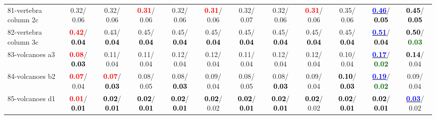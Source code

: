\begin{table}[h]
\begin{center}
{\begin{tabular}{lc|c|c|c|c|c|c|c|c|c|c}
81-vertebra column 2c &   0.32/  0.06 &   0.32/  0.06 & \textcolor{red}{\textbf{  0.31}}/  0.06 &   0.32/  0.06 & \textcolor{red}{\textbf{  0.31}}/  0.06 &   0.32/  0.07 &   0.32/  0.06 & \textcolor{red}{\textbf{  0.31}}/  0.06 &   0.35/  0.06 & \underline{\textcolor{blue}{\textbf{  0.46}}}/\textcolor{black}{\textbf{  0.05}} & \textcolor{black}{\textbf{  0.45}}/\textcolor{black}{\textbf{  0.05}} \\
82-vertebra column 3c & \textcolor{red}{\textbf{  0.42}}/\textcolor{black}{\textbf{  0.04}} &   0.43/\textcolor{black}{\textbf{  0.04}} &   0.45/\textcolor{black}{\textbf{  0.04}} &   0.45/\textcolor{black}{\textbf{  0.04}} &   0.45/\textcolor{black}{\textbf{  0.04}} &   0.45/\textcolor{black}{\textbf{  0.04}} &   0.45/\textcolor{black}{\textbf{  0.04}} &   0.45/\textcolor{black}{\textbf{  0.04}} &   0.45/\textcolor{black}{\textbf{  0.04}} & \underline{\textcolor{blue}{\textbf{  0.51}}}/\textcolor{black}{\textbf{  0.04}} & \textcolor{black}{\textbf{  0.50}}/\textcolor{darkgreen}{\textbf{  0.03}} \\
83-volcanoes a3 & \textcolor{red}{\textbf{  0.08}}/\textcolor{black}{\textbf{  0.03}} &   0.11/  0.04 &   0.11/  0.04 &   0.12/  0.04 &   0.12/  0.04 &   0.11/  0.04 &   0.12/  0.04 &   0.12/  0.04 &   0.10/  0.04 & \underline{\textcolor{blue}{\textbf{  0.17}}}/\textcolor{darkgreen}{\textbf{  0.02}} & \textcolor{black}{\textbf{  0.14}}/  0.04 \\
84-volcanoes b2 & \textcolor{red}{\textbf{  0.07}}/  0.04 & \textcolor{red}{\textbf{  0.07}}/\textcolor{black}{\textbf{  0.03}} &   0.08/  0.05 &   0.08/\textcolor{black}{\textbf{  0.03}} &   0.09/  0.04 &   0.08/  0.05 &   0.08/\textcolor{black}{\textbf{  0.03}} &   0.09/  0.04 & \textcolor{black}{\textbf{  0.10}}/\textcolor{black}{\textbf{  0.03}} & \underline{\textcolor{blue}{\textbf{  0.19}}}/\textcolor{darkgreen}{\textbf{  0.02}} &   0.09/  0.04 \\
85-volcanoes d1 & \textcolor{red}{\textbf{  0.01}}/\textcolor{black}{\textbf{  0.01}} & \textcolor{black}{\textbf{  0.02}}/\textcolor{black}{\textbf{  0.01}} & \textcolor{black}{\textbf{  0.02}}/\textcolor{black}{\textbf{  0.01}} & \textcolor{black}{\textbf{  0.02}}/\textcolor{black}{\textbf{  0.01}} & \textcolor{black}{\textbf{  0.02}}/  0.02 & \textcolor{black}{\textbf{  0.02}}/\textcolor{black}{\textbf{  0.01}} & \textcolor{black}{\textbf{  0.02}}/\textcolor{black}{\textbf{  0.01}} & \textcolor{black}{\textbf{  0.02}}/  0.02 & \textcolor{black}{\textbf{  0.02}}/\textcolor{black}{\textbf{  0.01}} & \textcolor{black}{\textbf{  0.02}}/\textcolor{black}{\textbf{  0.01}} & \underline{\textcolor{blue}{\textbf{  0.03}}}/  0.02 \\ \hline

\end{tabular}}
\end{center}
\end{table}
